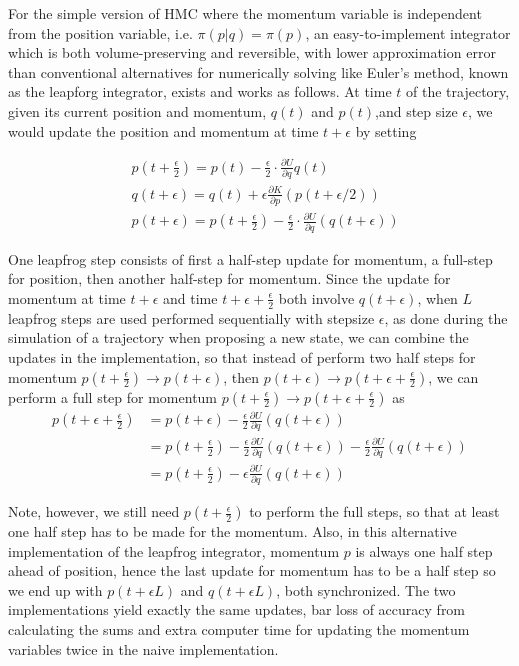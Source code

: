\documentclass[]{report}
\begin{document}
For the simple version of HMC where the momentum variable is independent from the position variable, i.e. $\pi(p|q)=\pi(p)$, an easy-to-implement integrator which is both volume-preserving and reversible, with lower approximation error than conventional alternatives for numerically solving like Euler's method, known as the leapforg integrator, exists and works as follows. At time $t$ of the trajectory, given its current position and momentum, $q(t)$ and $p(t)$,and step size $\epsilon$, we would update the position and momentum at time $t+\epsilon$ by setting 

\begin{align}
    &p(t+\frac{\epsilon}{2}) = p(t) - \frac{\epsilon}{2}\cdot \frac{\partial
    U}{\partial
    q}q(t) \\
    &q(t+\epsilon) = q(t) + \epsilon  \frac{\partial K}{\partial p}(p(t+\epsilon/2))
    \\
    &p(t+\epsilon) = p(t + \frac{\epsilon}{2}) - \frac{\epsilon} {2} \cdot \frac{\partial U}{\partial
    q}(q(t+\epsilon))
\end{align}

One leapfrog step consists of first a half-step update for momentum, a full-step
for position, then another half-step for momentum. Since the update for momentum
at time $t+\epsilon$ and time $t+\epsilon + \frac{\epsilon}{2}$ both involve
$q(t+\epsilon)$, when $L$ leapfrog steps are used performed sequentially with
 stepsize $\epsilon$, as done during the simulation of a trajectory when proposing a new
 state,  we can combine the updates in the implementation, so that instead of perform two half steps for momentum $p(t+\frac{\epsilon}{2}) \rightarrow p(t+\epsilon)$, then $ p(t+\epsilon) \rightarrow p(t+\epsilon + \frac{\epsilon}{2})$, we can perform a full step for momentum $p(t+\frac{\epsilon}{2}) \rightarrow p(t+ \epsilon + \frac{\epsilon}{2}) $ as 
\begin{align}
p(t+\epsilon + \frac{\epsilon}{2})  
&= p(t+\epsilon) - \frac{\epsilon}{2} \frac{\partial U}{\partial q }(q(t+\epsilon)) \\
&= p(t+\frac{\epsilon}{2}) - \frac{\epsilon}{2} \frac{\partial U}{\partial q }(q(t+\epsilon)) - \frac{\epsilon}{2} \frac{\partial U}{\partial q }(q(t+\epsilon)) \\
&= p(t+\frac{\epsilon}{2}) - \epsilon \frac{\partial U}{\partial q }(q(t+\epsilon))
\end{align}

Note, however, we still need $p(t+\frac{\epsilon}{2})$ to perform the full
steps, so that at least one half step has to be made for the momentum. Also, in
this alternative implementation of the leapfrog integrator, momentum $p$ is
always one half step ahead of position, hence the last update for momentum has
to be a half step so we end up with $p(t+\epsilon L)$ and $q(t+\epsilon L )$,
both synchronized. The two implementations yield exactly the same updates, bar
loss of accuracy from calculating the sums and extra computer time for updating
the momentum variables twice in the naive implementation. 
\end{document}
